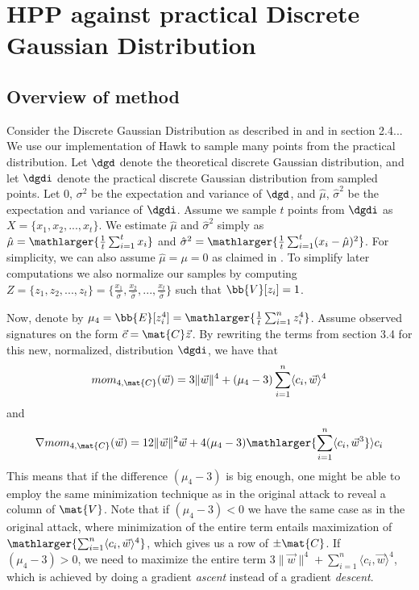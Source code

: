 \section{HPP against practical Discrete Gaussian Distribution}
\subsection{Overview of method}
Consider the Discrete Gaussian Distribution as described in \cite{HawkSpec24} and in section 2.4... We use our implementation of Hawk to sample many points from the practical distribution.
Let $\dgd$ denote the theoretical discrete Gaussian distribution, and let $\dgdi$ denote the practical discrete Gaussian distribution from sampled points.
Let $0$, $\sigma^2$ be the expectation and variance of $\dgd$, and $\hat{\mu}$, $\hat{\sigma}^2$ be the expectation and variance of $\dgdi$.
Assume we sample $t$ points from $\dgdi$ as $X = \{x_1, x_2, ..., x_t\}$. We estimate $\hat{\mu}$ and $\hat{\sigma}^2$ simply as $\hat{\mu} = \mathlarger{\frac{1}{t} \sum_{i=1}^{t} x_i}$ and $\hat{\sigma}^2 = \mathlarger{\frac{1}{t} \sum_{i=1}^{t}(x_i - \hat{\mu})^2}$.
For simplicity, we can also assume $\hat{\mu} = \mu = 0$ as claimed in \cite{HawkSpec24}.
To simplify later computations we also normalize our samples by computing $Z = \{z_1, z_2, ..., z_t\} = \{\frac{x_1}{\hat{\sigma}}, \frac{x_2}{\hat{\sigma}},..., \frac{x_t}{\hat{\sigma}}\}$ such that 
$\bb{V}[z_i] = 1$.

Now, denote by $\mu_4 = \bb{E}[z_i^4] = \mathlarger{\frac{1}{t} \sum_{i=1}^{n} z_i ^4}$. Assume observed signatures on the form $\vec{c} = \mat{C} \vec{z}$. By rewriting the terms from section 3.4 for this new, normalized, distribution $\dgdi$, we have that
\[mom_{4, \mat{C}} (\vec{w}) = 3 \lVert \vec{w} \rVert ^4 + (\mu_4 - 3) \sum_{i=1}^{n} \langle c_i, \vec{w} \rangle^4 \]
and
\[\nabla mom_{4, \mat{C}} (\vec{w}) = 12 \lVert \vec{w} \rVert^2 \vec{w} + 4(\mu_4 - 3) \mathlarger{\sum_{i=1}^{n} \langle c_i, \vec{w}^3} \rangle c_i\]
This means that if the difference $(\mu_4 - 3)$ is big enough, one might be able to employ the same minimization technique as in the original attack to reveal a column of $\mat{V}$.
Note that if $(\mu_4 - 3) < 0$ we have the same case as in the original attack, where minimization of the entire term entails maximization of $\mathlarger{\sum_{i=1}^{n} \langle c_i, \vec{w} \rangle^4}$, which gives us a row of $\pm \mat{C}$.
If $(\mu_4 - 3) > 0$, we need to maximize the entire term $3 \lVert \vec{w} \rVert ^4 + \sum_{i=1}^{n} \langle c_i, \vec{w} \rangle^4$, which is achieved by doing a gradient \textit{ascent} instead of a gradient \textit{descent}.

